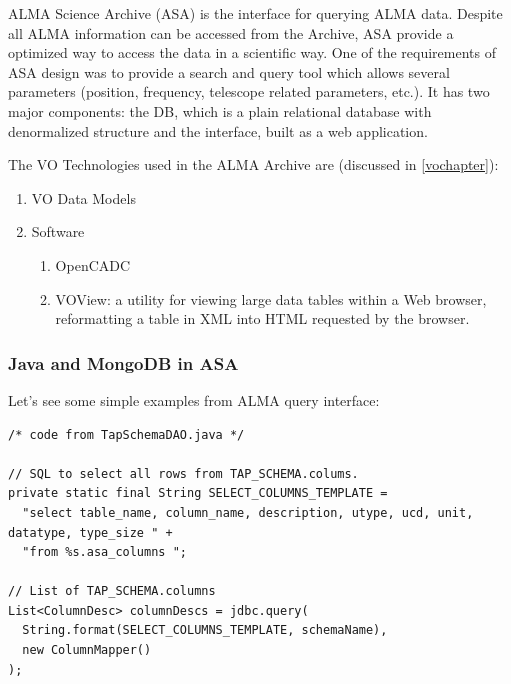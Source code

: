 ALMA Science Archive (ASA) is the interface for querying ALMA data. Despite all ALMA information can be accessed from the Archive, ASA provide a optimized way to access the data in a scientific way. One of the requirements of ASA design was to provide a search and query tool which allows several parameters (position, frequency, telescope related parameters, etc.). It has two major components: the DB, which is a plain relational database with denormalized structure and the interface, built as a web application.



The VO Technologies used in the ALMA Archive are (discussed in \ref{vochapter}):

\begin{enumerate}
\item VO Data Models
\item Software
  \begin{enumerate}
    \item OpenCADC
    \item VOView: a utility for viewing large data tables within a Web browser, reformatting a table in XML into HTML requested by the browser.
  \end{enumerate}
\end{enumerate}

\subsubsection{Java and MongoDB in ASA}

Let's see some simple examples from ALMA query interface: 

\newpage
\begin{lstlisting}
/* code from TapSchemaDAO.java */

// SQL to select all rows from TAP_SCHEMA.colums.
private static final String SELECT_COLUMNS_TEMPLATE = 
  "select table_name, column_name, description, utype, ucd, unit, datatype, type_size " +
  "from %s.asa_columns ";

// List of TAP_SCHEMA.columns
List<ColumnDesc> columnDescs = jdbc.query(
  String.format(SELECT_COLUMNS_TEMPLATE, schemaName),
  new ColumnMapper()
);


\end{lstlisting}

% 
